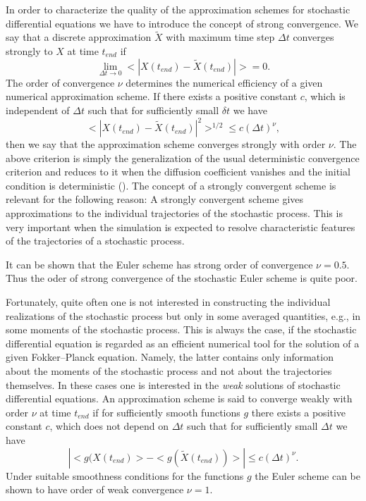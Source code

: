 In order to characterize the quality of the approximation schemes 
for stochastic differential equations we have to introduce the 
concept of strong convergence. We say that a discrete 
approximation $\tilde{X}$ with maximum time step $\Delta t$
converges strongly to $X$ at time $t_{end}$ if
\begin{equation*}
\lim_{\Delta t \rightarrow 0} <|X(t_{end}) - \tilde{X}(t_{end})|> 
=0.
\end{equation*}
The order of convergence $\nu$ determines the numerical efficiency
of a given numerical approximation scheme. If there exists a 
positive constant $c$, which is independent of $\Delta t$ such 
that for sufficiently small $\delta t$ we have
\begin{equation*}
<|X(t_{end}) - \tilde{X}(t_{end})|^2>^{1/2} \le c (\Delta t)^{\nu},
\end{equation*}
then we say that the approximation scheme converges strongly with
order $\nu$. 
The above criterion is simply the generalization of the usual 
deterministic convergence criterion and reduces to it when the 
diffusion coefficient vanishes and the initial condition is
deterministic (\cite{KLOEDEN_AN}). 
The concept of a strongly  convergent scheme is relevant for the
following reason: A strongly convergent scheme gives 
approximations to the individual trajectories of the 
stochastic process. This is very important when the simulation is 
expected to resolve characteristic features of the trajectories of 
a stochastic process.

It can be shown that the Euler scheme  has strong 
order of convergence $\nu = 0.5$. Thus the oder of strong 
convergence of the stochastic Euler scheme is quite poor.

Fortunately, quite often one is not interested in constructing the 
individual realizations of the stochastic process but only in some 
averaged quantities, e.g., in some moments of the stochastic 
process. This is always the case, if the stochastic differential 
equation is regarded as an efficient numerical tool for the
solution of a given Fokker--Planck equation. Namely, the latter 
contains only information about the moments of the stochastic 
process and not about the trajectories themselves. In these cases
one is interested in the {\em weak} solutions of stochastic 
differential equations. An approximation scheme is said to 
converge weakly with order $\nu$ at time $t_{end}$ if for 
sufficiently smooth functions $g$ there exists a positive constant 
$c$, which does not depend on $\Delta t$ such that for 
sufficiently small $\Delta t$ we have
\begin{equation*}
|<g(X(t_{end})> - <g(\tilde{X}(t_{end}))>| \le c (\Delta t)^{\nu}.
\end{equation*}
Under suitable smoothness conditions for the functions $g$ the 
Euler scheme can be shown to have order of weak convergence 
$\nu=1$.

